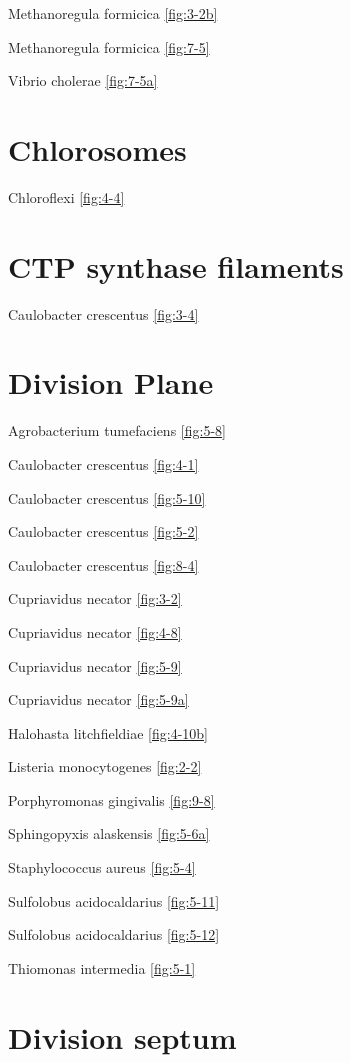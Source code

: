 \documentclass[]{tufte-book}
\begin{document}
Methanoregula formicica \ref{fig:3-2b}

Methanoregula formicica \ref{fig:7-5}

Vibrio cholerae \ref{fig:7-5a}

\section{\texorpdfstring{\textbf{Chlorosomes}}{Chlorosomes}}\label{chlorosomes}

Chloroflexi \ref{fig:4-4}

\section{\texorpdfstring{\textbf{CTP synthase
filaments}}{CTP synthase filaments}}\label{ctp-synthase-filaments}

Caulobacter crescentus \ref{fig:3-4}

\section{\texorpdfstring{\textbf{Division
Plane}}{Division Plane}}\label{division-plane}

Agrobacterium tumefaciens \ref{fig:5-8}

Caulobacter crescentus \ref{fig:4-1}

Caulobacter crescentus \ref{fig:5-10}

Caulobacter crescentus \ref{fig:5-2}

Caulobacter crescentus \ref{fig:8-4}

Cupriavidus necator \ref{fig:3-2}

Cupriavidus necator \ref{fig:4-8}

Cupriavidus necator \ref{fig:5-9}

Cupriavidus necator \ref{fig:5-9a}

Halohasta litchfieldiae \ref{fig:4-10b}

Listeria monocytogenes \ref{fig:2-2}

Porphyromonas gingivalis \ref{fig:9-8}

Sphingopyxis alaskensis \ref{fig:5-6a}

Staphylococcus aureus \ref{fig:5-4}

Sulfolobus acidocaldarius \ref{fig:5-11}

Sulfolobus acidocaldarius \ref{fig:5-12}

Thiomonas intermedia \ref{fig:5-1}

\section{\texorpdfstring{\textbf{Division
septum}}{Division septum}}\label{division-septum}
\end{document}
